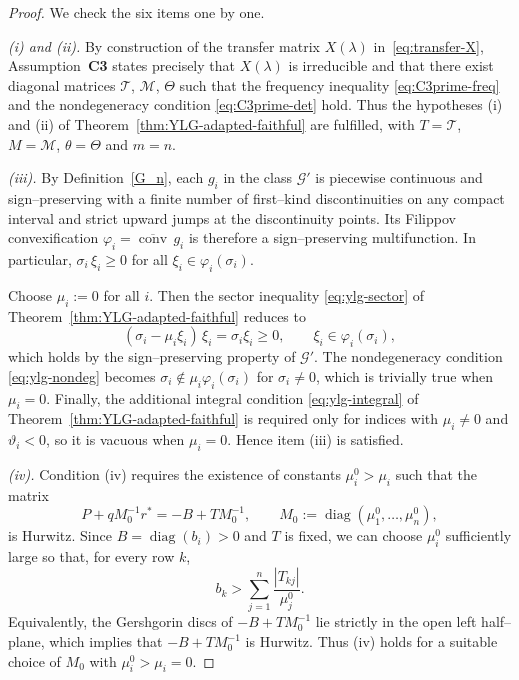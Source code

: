 \documentclass[journal]{IEEEtran}
\theoremstyle{myplain}
\begin{document}
\begin{proof}
We check the six items one by one.

\smallskip\noindent
\textit{(i) and (ii).}
By construction of the transfer matrix $X(\lambda)$
in~\eqref{eq:transfer-X}, Assumption~\textbf{C3} states precisely
that $X(\lambda)$ is irreducible and that there exist diagonal
matrices $\mathcal T$, $\mathcal M$, $\Theta$ such that the frequency
inequality \eqref{eq:C3prime-freq} and the nondegeneracy condition
\eqref{eq:C3prime-det} hold.  Thus the hypotheses (i) and (ii) of
Theorem~\ref{thm:YLG-adapted-faithful} are fulfilled, with $T=\mathcal T$,
$M=\mathcal M$, $\theta=\Theta$ and $m=n$.

\smallskip\noindent
\textit{(iii).}
By Definition~\ref{G_n}, each $g_i$ in the class $\mathcal G'$ is piecewise continuous and sign–preserving with a finite number
of first–kind discontinuities on any compact interval and strict
upward jumps at the discontinuity points. Its Filippov
convexification $\varphi_i=\overline{\operatorname{conv}}\,g_i$ is therefore a sign–preserving multifunction.  In particular,
$\sigma_i\,\xi_i\ge 0$ for all $\xi_i\in\varphi_i(\sigma_i)$.

Choose $\mu_i:=0$ for all $i$.  Then the sector inequality \eqref{eq:ylg-sector} of
Theorem~\ref{thm:YLG-adapted-faithful} reduces to
\[
  (\sigma_i - \mu_i\xi_i)\,\xi_i
  = \sigma_i \xi_i \ge 0,
  \qquad \xi_i\in\varphi_i(\sigma_i),
\]
which holds by the sign–preserving property of $\mathcal G'$.  The
nondegeneracy condition \eqref{eq:ylg-nondeg} becomes
$\sigma_i\notin \mu_i\varphi_i(\sigma_i)$ for $\sigma_i\neq 0$, which
is trivially true when $\mu_i=0$.  Finally, the additional integral
condition \eqref{eq:ylg-integral} of Theorem~\ref{thm:YLG-adapted-faithful} is required only for indices with
$\mu_i\neq0$ and $\vartheta_i<0$, so it is vacuous when
$\mu_i=0$.  Hence item (iii) is satisfied.

\smallskip\noindent
\textit{(iv).}
Condition (iv) requires the existence of constants
$\mu_i^0>\mu_i$ such that the matrix
\[
  P + qM_0^{-1}r^{*}
  = -B + T M_0^{-1},\qquad
  M_0:=\operatorname{diag}(\mu_1^0,\dots,\mu_n^0),
\]
is Hurwitz.  Since $B=\operatorname{diag}(b_i)>0$ and $T$ is fixed, we
can choose $\mu_i^0$ sufficiently large so that, for every row $k$,
\[
  b_k
  > \sum_{j=1}^n \frac{|T_{kj}|}{\mu_j^0}.
\]
Equivalently, the Gershgorin discs of $-B+T M_0^{-1}$ lie strictly in
the open left half–plane, which implies that $-B+T M_0^{-1}$ is
Hurwitz.  Thus (iv) holds for a suitable choice of $M_0$ with
$\mu_i^0>\mu_i=0$.


\end{proof}
\end{document}
